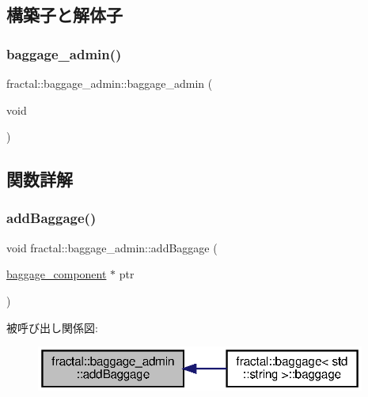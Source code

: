 \subsection{構築子と解体子}
\mbox{\label{classfractal_1_1baggage__admin_a5f0d4b9b9fc7345b4686f5d9100137c0}} 
\subsubsection{\texorpdfstring{baggage\+\_\+admin()}{baggage\_admin()}}
{\footnotesize\ttfamily fractal\+::baggage\+\_\+admin\+::baggage\+\_\+admin (\begin{DoxyParamCaption}\item[{void}]{ }\end{DoxyParamCaption})\hspace{0.3cm}{\ttfamily [inline]}}



\subsection{関数詳解}
\mbox{\label{classfractal_1_1baggage__admin_a0d53a03fac20a4641edb09f4ad422ad2}} 
\subsubsection{\texorpdfstring{add\+Baggage()}{addBaggage()}}
{\footnotesize\ttfamily void fractal\+::baggage\+\_\+admin\+::add\+Baggage (\begin{DoxyParamCaption}\item[{\hyperlink{classfractal_1_1baggage__component}{baggage\+\_\+component} $\ast$}]{ptr }\end{DoxyParamCaption})\hspace{0.3cm}{\ttfamily [inline]}}

被呼び出し関係図\+:
\nopagebreak
\begin{figure}[H]
\begin{center}
\leavevmode
\includegraphics[width=307pt]{classfractal_1_1baggage__admin_a0d53a03fac20a4641edb09f4ad422ad2_icgraph}
\end{center}
\end{figure}
\mbox{\label{classfractal_1_1baggage__admin_a5ac84caf1682026eb58b319cae6289f3}} 
